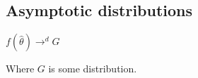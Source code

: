 
\subsection{Asymptotic distributions}

\(f(\hat \theta )\rightarrow^d G \)

Where \(G\) is some distribution.

